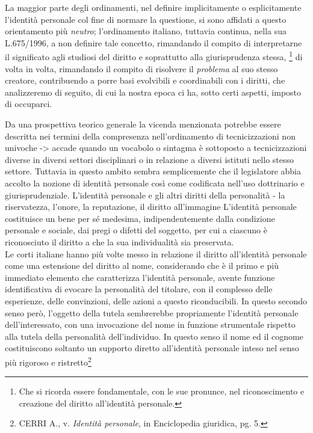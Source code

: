 La maggior parte degli ordinamenti, nel definire implicitamente o esplicitamente l'identità personale col fine di normare la questione, si sono affidati a questo orientamento più \textit{neutro}; l'ordinamento italiano, tuttavia continua, nella sua L.675/1996, a non definire tale concetto, rimandando il compito di interpretarne il significato agli studiosi del diritto e soprattutto alla giurisprudenza stessa, \footnote{Che si ricorda essere fondamentale, con le sue pronunce, nel riconoscimento e creazione del diritto all'identità personale.} di volta in volta, rimandando il compito di risolvere il \textit{problema} al suo stesso creatore, contribuendo a porre basi evolvibili e coordinabili con i diritti, che analizzeremo di seguito, di cui la nostra epoca ci ha, sotto certi aspetti, imposto di occuparci.

Da una prospettiva teorico generale la vicenda menzionata potrebbe essere descritta nei termini della compresenza nell’ordinamento di tecnicizzazioni non univoche -> accade quando un vocabolo o sintagma è sottoposto a tecnicizzazioni diverse in diversi settori disciplinari o in relazione a diversi istituti nello stesso settore.
Tuttavia in questo ambito sembra semplicemente che il legislatore abbia accolto la nozione di identità personale così come codificata nell’uso dottrinario e giurisprudenziale.
L'identità personale e gli altri diritti della personalità - la riservatezza, l’onore, la reputazione, il diritto all’immagine
L’identità personale costituisce un bene per sé medesima, indipendentemente dalla condizione personale e sociale, dai pregi o difetti del soggetto, per cui a ciascuno è riconosciuto il diritto a che la sua individualità sia preservata. 
\\Le corti italiane hanno più volte messo in relazione il diritto all’identità personale come una estensione del diritto al nome, considerando che è il primo e più immediato elemento che caratterizza l’identità personale, avente funzione identificativa di evocare la personalità del titolare, con il complesso delle esperienze, delle convinzioni, delle azioni a questo riconducibili. In questo secondo senso però, l’oggetto della tutela sembrerebbe propriamente l’identità personale dell’interessato, con una invocazione del nome in funzione strumentale rispetto alla tutela della personalità dell'individuo. In questo senso il nome ed il cognome costituiscono soltanto un supporto diretto all'identità personale inteso nel senso più rigoroso e ristretto\footnote{CERRI A., v. \textit{Identità personale}, in Enciclopedia giuridica, pg. 5.}
